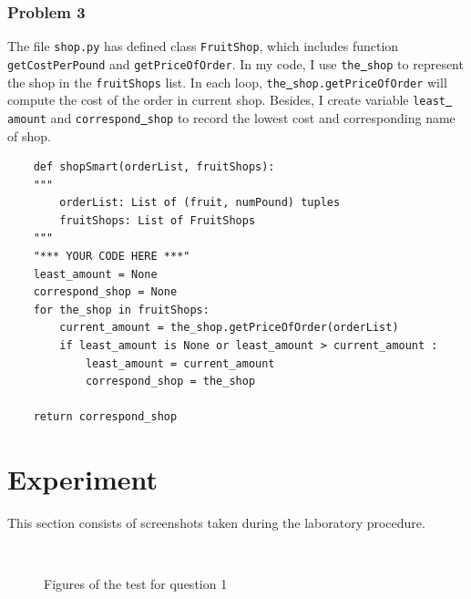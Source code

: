 \documentclass[aps,letterpaper,10pt]{revtex4}
\begin{document}
\subsubsection{Problem 3}

The file \texttt{shop.py} has defined class \texttt{FruitShop}, which includes function \texttt{getCostPerPound} and \texttt{getPriceOfOrder}. In my 
code, I use \texttt{the\underline{ }shop} to represent the shop in the \texttt{fruitShops} list. In each loop, \texttt{the\underline{ }shop.getPriceOfOrder} will compute 
the cost of the order in current shop. Besides, I create variable \texttt{least\underline{ }amount} and \texttt{correspond\underline{ }shop} to record the lowest cost and corresponding name of shop.


\begin{lstlisting}
	def shopSmart(orderList, fruitShops):
    """
        orderList: List of (fruit, numPound) tuples
        fruitShops: List of FruitShops
    """
    "*** YOUR CODE HERE ***"
    least_amount = None
    correspond_shop = None
    for the_shop in fruitShops:
        current_amount = the_shop.getPriceOfOrder(orderList)
        if least_amount is None or least_amount > current_amount :
            least_amount = current_amount
            correspond_shop = the_shop

    return correspond_shop
\end{lstlisting}

\newpage
\section{Experiment}
This section consists of screenshots taken during the laboratory procedure. 

	\begin{figure}[H]
	  \centering
	   \\
	  \caption{Figures of the test for question 1}
	  \label{fig:oscil}
	\end{figure}
\end{document}
